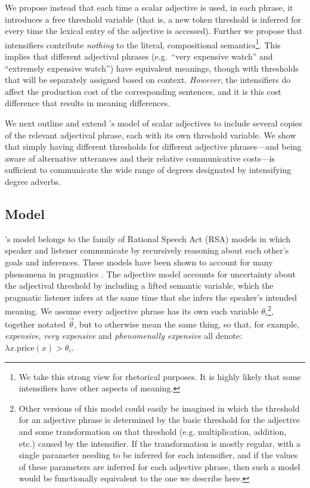 \documentclass[10pt,letterpaper]{article}
\newcommand{\w}[1]{\emph{#1}}
\begin{document}
We propose instead that each time a scalar adjective is used, in each phrase, it introduces a free threshold variable (that is, a new token threshold is inferred for every time the lexical entry of the adjective is accessed). Further we propose that intensifiers contribute \emph{nothing} to the literal, compositional semantics\footnote{We take this strong view for rhetorical purposes. It is highly likely that some intensifiers have other aspects of meaning.}. This implies that different adjectival phrases (e.g.~``very expensive watch'' and ``extremely expensive watch'') have equivalent meanings, though with thresholds that will be separately assigned based on context. \emph{However}, the intensifiers do affect the production cost of the corresponding sentences, and it is this cost difference that results in meaning differences.

We next outline and extend \citeauthor{lassiter}'s model of scalar adjectives to include several copies of the relevant adjectival phrase, each with its own threshold variable.
We show that simply having different thresholds for different adjective phrases---and being aware of alternative utterances and their relative communicative costs---is sufficient to communicate the wide range of degrees designated by intensifying degree adverbs.

\subsection{Model}

's model belongs to the family of Rational Speech Act (RSA) models in which speaker and listener communicate by recursively reasoning about each other's goals and inferences. These models have been shown to account for many phenomena in pragmatics
\cite{frank, goodman}. The adjective model accounts for uncertainty about the adjectival threshold by including a lifted semantic variable, which the pragmatic listener infers at the same time that she infers the speaker's intended meaning. 
We assume every adjective phrase has its own such variable $\theta_i$\footnote{Other versions of this model could easily be imagined in which the threshold for an adjective phrase is determined by the basic threshold for the adjective and some transformation on that threshold (e.g. multiplication, addition, etc.) caused by the intensifier. If the transformation is mostly regular, with a single parameter needing to be inferred for each intensifier, and if the values of these parameters are inferred for each adjective phrase, then such a model would be functionally equivalent to the one we describe here.}, together notated $\vec{\theta}$, but to otherwise mean the same thing, so that, for example, \w{expensive}, \w{very expensive} and \w{phenomenally expensive} all denote: $\lambda x . \text{price}(x) > \theta_i$. %
\end{document}
